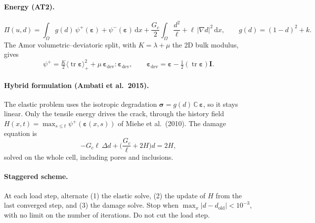 \documentclass[11pt]{article}
\begin{document}
\paragraph{Energy (AT2).}
\[
  \Pi(u,d) = \int_\Omega g(d)\,\psi^+(\boldsymbol\varepsilon) + \psi^-(\boldsymbol\varepsilon)\,\mathrm dx
  + \frac{G_c}{2}\int_\Omega \frac{d^2}{\ell} + \ell\,|\nabla d|^2\,\mathrm dx, \qquad g(d) = (1-d)^2 + k .
\]
The Amor volumetric--deviatoric split, with $K = \lambda + \mu$ the 2D bulk modulus, gives
\[
  \psi^+ = \tfrac{K}{2}\langle \operatorname{tr}\boldsymbol\varepsilon\rangle_+^2
  + \mu\,\boldsymbol\varepsilon_{\mathrm{dev}}:\boldsymbol\varepsilon_{\mathrm{dev}},
  \qquad \boldsymbol\varepsilon_{\mathrm{dev}} = \boldsymbol\varepsilon - \tfrac12(\operatorname{tr}\boldsymbol\varepsilon)\mathbf I .
\]

\paragraph{Hybrid formulation (Ambati et al.\ 2015).} The elastic problem uses the isotropic degradation
$\boldsymbol\sigma = g(d)\,\mathbb C\,\boldsymbol\varepsilon$, so it stays linear. Only the tensile energy drives the
crack, through the history field $H(x,t) = \max_{s\le t}\psi^+(\boldsymbol\varepsilon(x,s))$ of Miehe et al.\ (2010).
The damage equation is
\[
  -G_c\ell\,\Delta d + \Big(\frac{G_c}{\ell} + 2H\Big) d = 2H ,
\]
solved on the whole cell, including pores and inclusions.

\paragraph{Staggered scheme.} At each load step, alternate (1) the elastic solve, (2) the update of $H$ from the last
converged step, and (3) the damage solve. Stop when $\max_x|d - d_{\mathrm{old}}| < 10^{-3}$, with no limit on the
number of iterations. Do not cut the load step.
\end{document}
